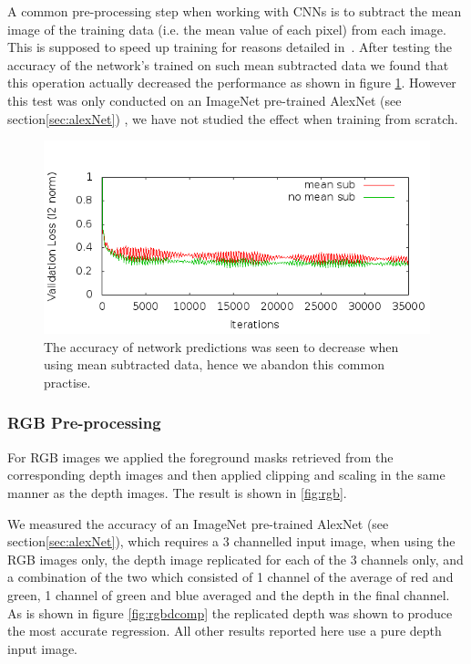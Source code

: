 \documentclass[11pt]{article} %
\begin{document}
A common pre-processing step when working with CNNs is to subtract the mean image of the training data (i.e. the mean value of each pixel) from each image. This is supposed to speed up training for reasons detailed in~\cite{LeCun1998a,Bottou2010,LeCun2012}. After testing the accuracy of the network's trained on such mean subtracted data we found that this operation actually decreased the performance as shown in figure \ref{fig:meanSubComp}. However this test was only conducted on an ImageNet pre-trained AlexNet (see section\ref{sec:alexNet}) , we have not studied the effect when training from scratch.

\begin{figure}
\includegraphics*[width=0.9\linewidth,clip]{meanSubComp.png} %
\caption{The accuracy of network predictions was seen to decrease when using mean subtracted data, hence we abandon this common practise.}
\label{fig:meanSubComp}
\end{figure}


\subsubsection{RGB Pre-processing}

For RGB images we applied the foreground masks retrieved from the corresponding depth images and then applied clipping and scaling in the same manner as the depth images. The result is shown in \ref{fig:rgb}. 

We measured the accuracy of an ImageNet pre-trained AlexNet (see section\ref{sec:alexNet}), which requires a 3 channelled input image, when using the RGB images only, the depth image replicated for each of the 3 channels only, and a combination of the two which consisted of 1 channel of the average of red and green, 1 channel of green and blue averaged and the depth in the final channel. As is shown in figure \ref{fig:rgbdcomp} the replicated depth was shown to produce the most accurate regression. All other results reported here use a pure depth input image. 
\end{document}
